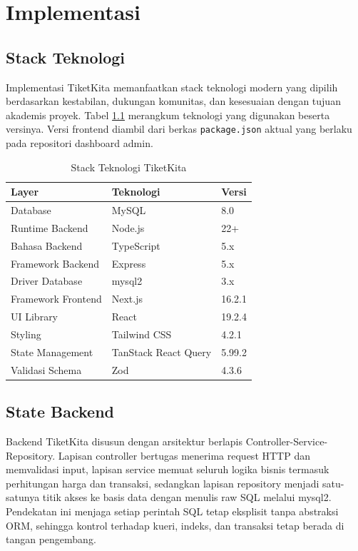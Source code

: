 \documentclass[12pt,a4paper]{report}
\begin{document}
\chapter{Implementasi}

\section{Stack Teknologi}
Implementasi TiketKita memanfaatkan stack teknologi modern yang dipilih berdasarkan kestabilan, dukungan komunitas, dan kesesuaian dengan tujuan akademis proyek. Tabel \ref{tab:stack-teknologi} merangkum teknologi yang digunakan beserta versinya. Versi frontend diambil dari berkas \texttt{package.json} aktual yang berlaku pada repositori dashboard admin.

\begin{table}[h]
\centering
\caption{Stack Teknologi TiketKita}
\label{tab:stack-teknologi}
\begin{tabular}{lll}
\toprule
\textbf{Layer} & \textbf{Teknologi} & \textbf{Versi} \\
\midrule
Database          & MySQL                  & 8.0 \\
Runtime Backend   & Node.js                & 22+ \\
Bahasa Backend    & TypeScript             & 5.x \\
Framework Backend & Express                & 5.x \\
Driver Database   & mysql2                 & 3.x \\
Framework Frontend & Next.js               & 16.2.1 \\
UI Library        & React                  & 19.2.4 \\
Styling           & Tailwind CSS           & 4.2.1 \\
State Management  & TanStack React Query   & 5.99.2 \\
Validasi Schema   & Zod                    & 4.3.6 \\
\bottomrule
\end{tabular}
\end{table}

\section{State Backend}
Backend TiketKita disusun dengan arsitektur berlapis Controller-Service-Repository. Lapisan controller bertugas menerima request HTTP dan memvalidasi input, lapisan service memuat seluruh logika bisnis termasuk perhitungan harga dan transaksi, sedangkan lapisan repository menjadi satu-satunya titik akses ke basis data dengan menulis raw SQL melalui mysql2. Pendekatan ini menjaga setiap perintah SQL tetap eksplisit tanpa abstraksi ORM, sehingga kontrol terhadap kueri, indeks, dan transaksi tetap berada di tangan pengembang.
\end{document}
